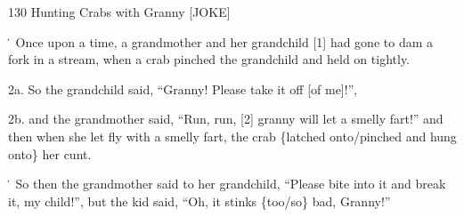 
130 Hunting Crabs with Granny [JOKE]

\. Once upon a time, a grandmother and her grandchild [1] had gone to dam a fork
in a stream, when a crab pinched the grandchild and held on tightly.

2a. So the grandchild said, ``Granny! Please take it off [of me]!'',

2b. and the grandmother said, ``Run, run, [2] granny will let a smelly fart!''
and then when she let fly with a smelly fart, the crab \{latched onto/pinched and
hung onto\} her cunt.

\. So then the grandmother said to her grandchild, ``Please bite into it and break
it, my child!'', but the kid said, ``Oh, it stinks \{too/so\} bad, Granny!''

